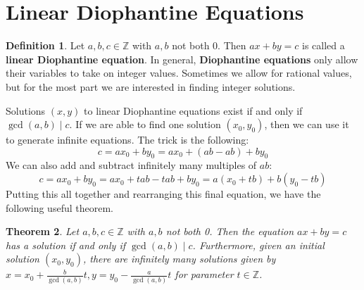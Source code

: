 \documentclass[11pt]{amsart}
\newtheorem{theorem}{Theorem}[section]
\theoremstyle{definition}
\newtheorem{definition}[theorem]{Definition}
\newcommand{\integers}{\mathbb{Z}}
\begin{document}
\section{Linear Diophantine Equations}
\begin{definition}
	Let $a, b, c \in \integers$ with $a, b$ not both 0. Then $ax + by = c$ is called a \textbf{linear Diophantine equation}. In general, 
	\textbf{Diophantine equations} only allow their variables to take on integer values. Sometimes we allow for rational values,
	but for the most part we are interested in finding integer solutions.
\end{definition}
Solutions $(x, y)$ to linear Diophantine equations exist if and only if $\gcd(a, b) \mid c$. If we are able to find one solution
$(x_0, y_0)$, then we can use it to generate infinite equations. The trick is the following:
\[ c = ax_0 + by_0 = ax_0 + (ab - ab) + by_0 \]
We can also add and subtract infinitely many multiples of $ab$:
\[ c = ax_0 + by_0 = ax_0 + tab - tab + by_0 = a(x_0 + tb) + b(y_0 - tb) \]
Putting this all together and rearranging this final equation, we have the following useful theorem.
\begin{theorem}
	Let $a, b, c \in \integers$ with $a, b$ not both 0. Then the equation $ax + by = c$ has a solution if and only if $\gcd(a, b) \mid c$.
	Furthermore, given an initial solution $(x_0, y_0)$, there are infinitely many solutions given by 
	$x = x_0 + \frac{b}{\gcd(a, b)}t, y = y_0 - \frac{a}{\gcd(a, b)}t$ for parameter $t \in \integers$.
\end{theorem}
\end{document}
